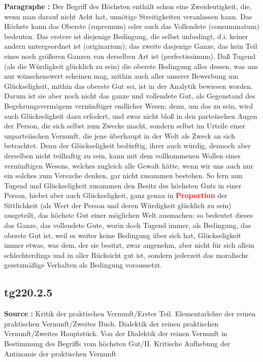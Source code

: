 \documentclass[a4paper,12pt,twoside]{book}
\newcommand{\match}[1]{\textcolor{red}{\textbf{#1}}}
\begin{document}
	\textbf{Paragraphe : }Der Begriff des Höchsten enthält schon eine Zweideutigkeit, die, wenn man darauf nicht Acht hat, unnötige Streitigkeiten veranlassen kann. Das Höchste kann das Oberste (supremum) oder auch das Vollendete (consummatum) bedeuten. Das erstere ist diejenige Bedingung, die selbst unbedingt, d.i. keiner andern untergeordnet ist (originarium); das zweite dasjenige Ganze, das kein Teil eines noch größeren Ganzen von derselben Art ist (perfectissimum). Daß Tugend (als die Würdigkeit glücklich zu sein) die oberste Bedingung alles dessen, was uns nur wünschenswert scheinen mag, mithin auch aller unserer Bewerbung um Glückseligkeit, mithin das oberste Gut sei, ist in der Analytik bewiesen worden. Darum ist sie aber noch nicht das ganze und vollendete Gut, als Gegenstand des Begehrungsvermögens vernünftiger endlicher Wesen; denn, um das zu sein, wird auch Glückseligkeit dazu erfodert, und zwar nicht bloß in den parteiischen Augen der Person, die sich selbst zum Zwecke macht, sondern selbst im Urteile einer unparteiischen Vernunft, die jene überhaupt in der Welt als Zweck an sich betrachtet. Denn der Glückseligkeit bedürftig, ihrer auch würdig, dennoch aber derselben nicht teilhaftig zu sein, kann mit dem vollkommenen Wollen eines vernünftigen Wesens, welches zugleich alle Gewalt hätte, wenn wir uns auch nur ein solches zum Versuche denken, gar nicht zusammen bestehen. So fern nun Tugend  und Glückseligkeit zusammen den Besitz des höchsten Guts in einer Person, hiebei aber auch Glückseligkeit, ganz genau in \match{Proportion} der Sittlichkeit (als Wert der Person und deren Würdigkeit glücklich zu sein) ausgeteilt, das höchste Gut einer möglichen Welt ausmachen: so bedeutet dieses das Ganze, das vollendete Gute, worin doch Tugend immer, als Bedingung, das oberste Gut ist, weil es weiter keine Bedingung über sich hat, Glückseligkeit immer etwas, was dem, der sie besitzt, zwar angenehm, aber nicht für sich allein schlechterdings und in aller Rücksicht gut ist, sondern jederzeit das moralische gesetzmäßige Verhalten als Bedingung voraussetzt. 
	
	\subsection*{tg220.2.5} 
	\textbf{Source : }Kritik der praktischen Vernunft/Erster Teil. Elementarlehre der reinen praktischen Vernunft/Zweites Buch. Dialektik der reinen praktischen Vernunft/Zweites Hauptstück. Von der Dialektik der reinen Vernunft in Bestimmung des Begriffs vom höchsten Gut/II. Kritische Aufhebung der Antinomie der praktischen Vernunft\\  
	
\end{document}
